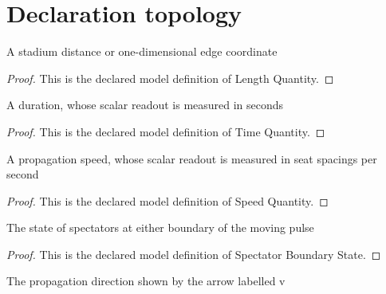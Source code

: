 \section{Declaration topology}
\begin{definition}
  \label{def:physics:phyx-mini-0285:phyxminiproblems-problemphyxmini0285-lengthquantity}
  A stadium distance or one-dimensional edge coordinate
\end{definition}
\begin{proof}
  This is the declared model definition of Length Quantity.
\end{proof}
\begin{definition}
  \label{def:physics:phyx-mini-0285:phyxminiproblems-problemphyxmini0285-timequantity}
  A duration, whose scalar readout is measured in seconds
\end{definition}
\begin{proof}
  This is the declared model definition of Time Quantity.
\end{proof}
\begin{definition}
  \label{def:physics:phyx-mini-0285:phyxminiproblems-problemphyxmini0285-speedquantity}
  A propagation speed, whose scalar readout is measured in seat spacings per second
\end{definition}
\begin{proof}
  This is the declared model definition of Speed Quantity.
\end{proof}
\begin{definition}
  \label{def:physics:phyx-mini-0285:phyxminiproblems-problemphyxmini0285-spectatorboundarystate}
  The state of spectators at either boundary of the moving pulse
\end{definition}
\begin{proof}
  This is the declared model definition of Spectator Boundary State.
\end{proof}
\begin{definition}
  \label{def:physics:phyx-mini-0285:phyxminiproblems-problemphyxmini0285-propagationdirection}
  The propagation direction shown by the arrow labelled v
\end{definition}
